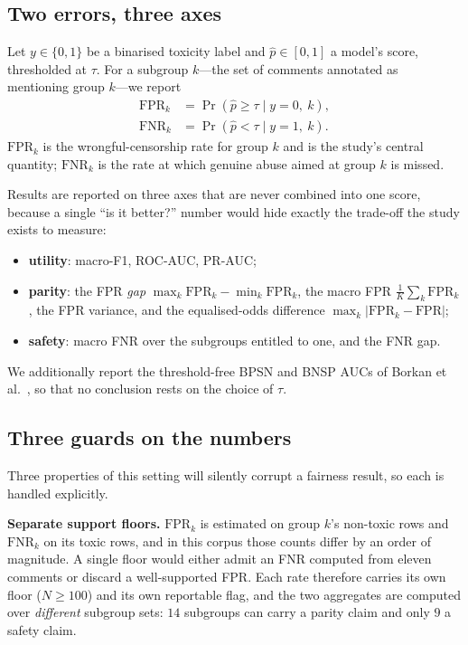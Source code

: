 \documentclass[conference]{IEEEtran}
\begin{document}
\subsection{Two errors, three axes}
Let $y \in \{0,1\}$ be a binarised toxicity label and $\hat{p} \in [0,1]$ a
model's score, thresholded at $\tau$. For a subgroup $k$---the set of comments
annotated as mentioning group $k$---we report
\begin{align}
\mathrm{FPR}_k &= \Pr(\hat{p} \geq \tau \mid y = 0,\ k), \\
\mathrm{FNR}_k &= \Pr(\hat{p} < \tau \mid y = 1,\ k).
\end{align}
$\mathrm{FPR}_k$ is the wrongful-censorship rate for group $k$ and is the
study's central quantity; $\mathrm{FNR}_k$ is the rate at which genuine abuse
aimed at group $k$ is missed.

Results are reported on three axes that are never combined into one score,
because a single ``is it better?'' number would hide exactly the trade-off the
study exists to measure:
\begin{itemize}
\item \textbf{utility}: macro-F1, ROC-AUC, PR-AUC;
\item \textbf{parity}: the FPR \emph{gap} $\max_k \mathrm{FPR}_k - \min_k
      \mathrm{FPR}_k$, the macro FPR $\frac{1}{K}\sum_k \mathrm{FPR}_k$, the FPR
      variance, and the equalised-odds difference $\max_k |\mathrm{FPR}_k -
      \mathrm{FPR}|$;
\item \textbf{safety}: macro FNR over the subgroups entitled to one, and the FNR
      gap.
\end{itemize}
We additionally report the threshold-free BPSN and BNSP AUCs of
Borkan et al.~\cite{borkan2019}, so that no conclusion rests on the choice of
$\tau$.

\subsection{Three guards on the numbers}
\label{sec:guards}
Three properties of this setting will silently corrupt a fairness result, so each
is handled explicitly.

\textbf{Separate support floors.} $\mathrm{FPR}_k$ is estimated on group $k$'s
non-toxic rows and $\mathrm{FNR}_k$ on its toxic rows, and in this corpus those
counts differ by an order of magnitude. A single floor would either admit an FNR
computed from eleven comments or discard a well-supported FPR. Each rate
therefore carries its own floor ($N \geq 100$) and its own reportable flag, and
the two aggregates are computed over \emph{different} subgroup sets: $14$
subgroups can carry a parity claim and only $9$ a safety claim.
\end{document}
